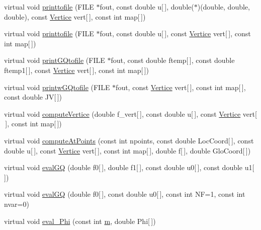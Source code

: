 \begin{DoxyCompactItemize}
virtual void \hyperlink{classTetrahedral_a1ebce59e415a8c8fa52b453439fc06ee}{printtofile} (F\+I\+LE $\ast$fout, const double u\mbox{[}$\,$\mbox{]}, double($\ast$)(double, double, double), const \hyperlink{structVertice}{Vertice} vert\mbox{[}$\,$\mbox{]}, const int map\mbox{[}$\,$\mbox{]})
\item 
virtual void \hyperlink{classTetrahedral_a615fe4c0df26ac87f46640c82fbe12b6}{printtofile} (F\+I\+LE $\ast$fout, const double u\mbox{[}$\,$\mbox{]}, const \hyperlink{structVertice}{Vertice} vert\mbox{[}$\,$\mbox{]}, const int map\mbox{[}$\,$\mbox{]})
\item 
virtual void \hyperlink{classTetrahedral_aa5daeb6d0461824263d4af49aeb15134}{print\+G\+Qtofile} (F\+I\+LE $\ast$fout, const double ftemp\mbox{[}$\,$\mbox{]}, const double ftemp1\mbox{[}$\,$\mbox{]}, const \hyperlink{structVertice}{Vertice} vert\mbox{[}$\,$\mbox{]}, const int map\mbox{[}$\,$\mbox{]})
\item 
virtual void \hyperlink{classTetrahedral_aaffdc06480015e7663d5c934a992b577}{printw\+G\+Qtofile} (F\+I\+LE $\ast$fout, const \hyperlink{structVertice}{Vertice} vert\mbox{[}$\,$\mbox{]}, const int map\mbox{[}$\,$\mbox{]}, const double JV\mbox{[}$\,$\mbox{]})
\item 
virtual void \hyperlink{classTetrahedral_a0cb9858197838f9f018e41a0ccd881c5}{compute\+Vertice} (double f\+\_\+vert\mbox{[}$\,$\mbox{]}, const double u\mbox{[}$\,$\mbox{]}, const \hyperlink{structVertice}{Vertice} vert\mbox{[}$\,$\mbox{]}, const int map\mbox{[}$\,$\mbox{]})
\item 
virtual void \hyperlink{classTetrahedral_afba2976521f6a8f5dab936879d3f16da}{compute\+At\+Points} (const int npoints, const double Loc\+Coord\mbox{[}$\,$\mbox{]}, const double u\mbox{[}$\,$\mbox{]}, const \hyperlink{structVertice}{Vertice} vert\mbox{[}$\,$\mbox{]}, const int map\mbox{[}$\,$\mbox{]}, double f\mbox{[}$\,$\mbox{]}, double Glo\+Coord\mbox{[}$\,$\mbox{]})
\item 
virtual void \hyperlink{classTetrahedral_aa32a1da52c137fd89f72af9bbfbf1524}{eval\+GQ} (double f0\mbox{[}$\,$\mbox{]}, double f1\mbox{[}$\,$\mbox{]}, const double u0\mbox{[}$\,$\mbox{]}, const double u1\mbox{[}$\,$\mbox{]})
\item 
virtual void \hyperlink{classTetrahedral_a2ffab801c153c3077ec7aec73d80b7bf}{eval\+GQ} (double f0\mbox{[}$\,$\mbox{]}, const double u0\mbox{[}$\,$\mbox{]}, const int NF=1, const int nvar=0)
\item 
virtual void \hyperlink{classTetrahedral_ac0dec119fa6faa28f52ca8416e0214b2}{eval\+\_\+\+Phi} (const int \hyperlink{DG__EI__Header_8h_a742204794ea328ba293fe59cec79b990}{m}, double Phi\mbox{[}$\,$\mbox{]})

\end{DoxyCompactItemize}
